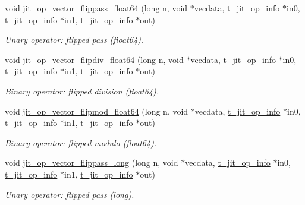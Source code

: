 \begin{DoxyCompactItemize}
void \hyperlink{group__opvecmod_gaf66a46b630eae9f23c6e2d5f93eb2233}{jit\_\-op\_\-vector\_\-flippass\_\-float64} (long n, void $\ast$vecdata, \hyperlink{structt__jit__op__info}{t\_\-jit\_\-op\_\-info} $\ast$in0, \hyperlink{structt__jit__op__info}{t\_\-jit\_\-op\_\-info} $\ast$in1, \hyperlink{structt__jit__op__info}{t\_\-jit\_\-op\_\-info} $\ast$out)
\begin{DoxyCompactList}\small\item\em Unary operator: flipped pass (float64). \item\end{DoxyCompactList}\item 
void \hyperlink{group__opvecmod_gac322162e3b3e0a31c8b9aa5739de8f00}{jit\_\-op\_\-vector\_\-flipdiv\_\-float64} (long n, void $\ast$vecdata, \hyperlink{structt__jit__op__info}{t\_\-jit\_\-op\_\-info} $\ast$in0, \hyperlink{structt__jit__op__info}{t\_\-jit\_\-op\_\-info} $\ast$in1, \hyperlink{structt__jit__op__info}{t\_\-jit\_\-op\_\-info} $\ast$out)
\begin{DoxyCompactList}\small\item\em Binary operator: flipped division (float64). \item\end{DoxyCompactList}\item 
void \hyperlink{group__opvecmod_gaf0793db1538d53120069e25d592c0513}{jit\_\-op\_\-vector\_\-flipmod\_\-float64} (long n, void $\ast$vecdata, \hyperlink{structt__jit__op__info}{t\_\-jit\_\-op\_\-info} $\ast$in0, \hyperlink{structt__jit__op__info}{t\_\-jit\_\-op\_\-info} $\ast$in1, \hyperlink{structt__jit__op__info}{t\_\-jit\_\-op\_\-info} $\ast$out)
\begin{DoxyCompactList}\small\item\em Binary operator: flipped modulo (float64). \item\end{DoxyCompactList}\item 
void \hyperlink{group__opvecmod_gaf5cd2ed8198cee977810eae076175957}{jit\_\-op\_\-vector\_\-flippass\_\-long} (long n, void $\ast$vecdata, \hyperlink{structt__jit__op__info}{t\_\-jit\_\-op\_\-info} $\ast$in0, \hyperlink{structt__jit__op__info}{t\_\-jit\_\-op\_\-info} $\ast$in1, \hyperlink{structt__jit__op__info}{t\_\-jit\_\-op\_\-info} $\ast$out)
\begin{DoxyCompactList}\small\item\em Unary operator: flipped pass (long). \item\end{DoxyCompactList}\item 

\end{DoxyCompactItemize}
